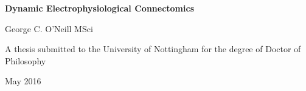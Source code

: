 \thispagestyle{empty}
\begin{center}
\begin{minipage}{0.75\linewidth}
    \centering
    \vspace{2cm}
    {{\huge\textsf{\textbf{Dynamic Electrophysiological Connectomics}} \par}}
    \vspace{3cm}
    {\Large \textsf{George C. O'Neill MSci}\par}
    \vspace{10cm}
    {\Large \textsf{A thesis submitted to the University of Nottingham for the degree of Doctor of Philosophy}\par}
    \vspace{1cm}
    {\Large \textsf{May 2016}}
\end{minipage}
\end{center}
\clearpage

